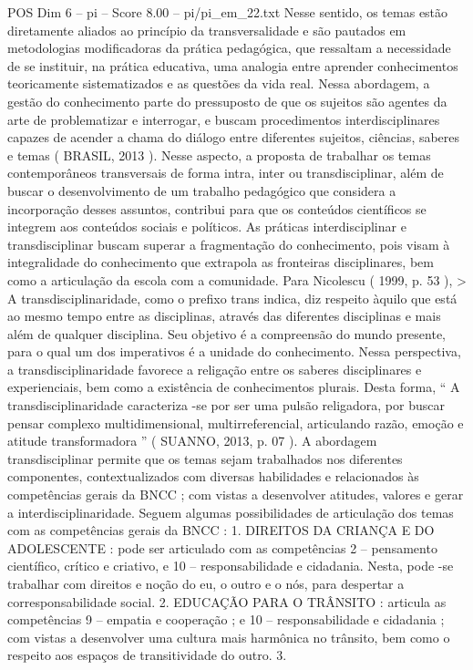 \begin{textsample}{POS Dim 6 – pi – Score 8.00 – pi/pi\_em\_22.txt}
Nesse sentido, os temas estão diretamente aliados ao princípio da transversalidade e são pautados em metodologias modificadoras da prática pedagógica, que ressaltam a necessidade de se instituir, na prática educativa, uma analogia entre aprender conhecimentos teoricamente sistematizados e as questões da vida real.
Nessa abordagem, a gestão do conhecimento parte do pressuposto de que os sujeitos são agentes da arte de problematizar e interrogar, e buscam procedimentos interdisciplinares capazes de acender a chama do diálogo entre diferentes sujeitos, ciências, saberes e temas ( BRASIL, 2013 ).
Nesse aspecto, a proposta de trabalhar os temas contemporâneos transversais de forma intra, inter ou transdisciplinar, além de buscar o desenvolvimento de um trabalho pedagógico que considera a incorporação desses assuntos, contribui para que os conteúdos científicos se integrem aos conteúdos sociais e políticos.
As práticas interdisciplinar e transdisciplinar buscam superar a fragmentação do conhecimento, pois visam à integralidade do conhecimento que extrapola as fronteiras disciplinares, bem como a articulação da escola com a comunidade.
Para Nicolescu ( 1999, p. 53 ), > A transdisciplinaridade, como o prefixo trans indica, diz respeito àquilo que está ao mesmo tempo entre as disciplinas, através das diferentes disciplinas e mais além de qualquer disciplina.
Seu objetivo é a compreensão do mundo presente, para o qual um dos imperativos é a unidade do conhecimento.
Nessa perspectiva, a transdisciplinaridade favorece a religação entre os saberes disciplinares e experienciais, bem como a existência de conhecimentos plurais.
Desta forma, “ A transdisciplinaridade caracteriza -se por ser uma pulsão religadora, por buscar pensar complexo multidimensional, multirreferencial, articulando razão, emoção e atitude transformadora ” ( SUANNO, 2013, p. 07 ).
A abordagem transdisciplinar permite que os temas sejam trabalhados nos diferentes componentes, contextualizados com diversas habilidades e relacionados às competências gerais da BNCC ; com vistas a desenvolver atitudes, valores e gerar a interdisciplinaridade.
Seguem algumas possibilidades de articulação dos temas com as competências gerais da BNCC : 1.
DIREITOS DA CRIANÇA E DO ADOLESCENTE : pode ser articulado com as competências 2 – pensamento científico, crítico e criativo, e 10 – responsabilidade e cidadania.
Nesta, pode -se trabalhar com direitos e noção do eu, o outro e o nós, para despertar a corresponsabilidade social. 2.
EDUCAÇÃO PARA O TRÂNSITO : articula as competências 9 – empatia e cooperação ; e 10 – responsabilidade e cidadania ; com vistas a desenvolver uma cultura mais harmônica no trânsito, bem como o respeito aos espaços de transitividade do outro. 3.

\end{textsample}
